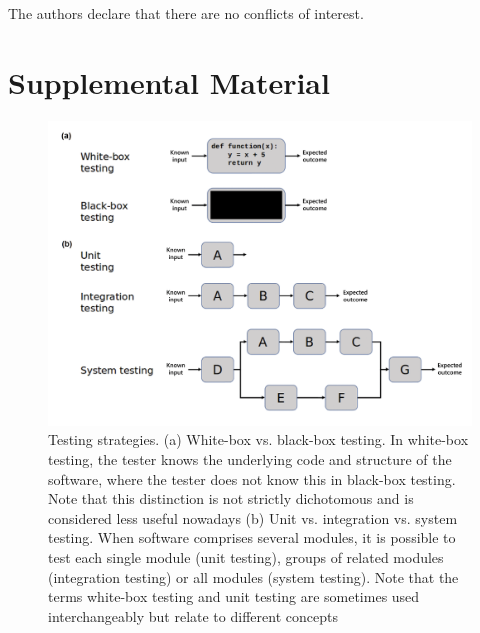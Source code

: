 The authors declare that there are no conflicts of interest.

\section{Supplemental Material}

\begin{figure}[]
\centering
\includegraphics[width=\textwidth]{figures/chapter 8/mgen000790-f1.png}
\caption{Testing strategies. (a) White-box vs. black-box testing. In white-box testing, the tester knows the underlying code and structure of the software, where the tester does not know this in black-box testing. Note that this distinction is not strictly dichotomous and is considered less useful nowadays (b) Unit vs. integration vs. system testing. When software comprises several modules, it is possible to test each single module (unit testing), groups of related modules (integration testing) or all modules (system testing). Note that the terms white-box testing and unit testing are sometimes used interchangeably but relate to different concepts}
\label{fig:chap8_figure1}
\end{figure}